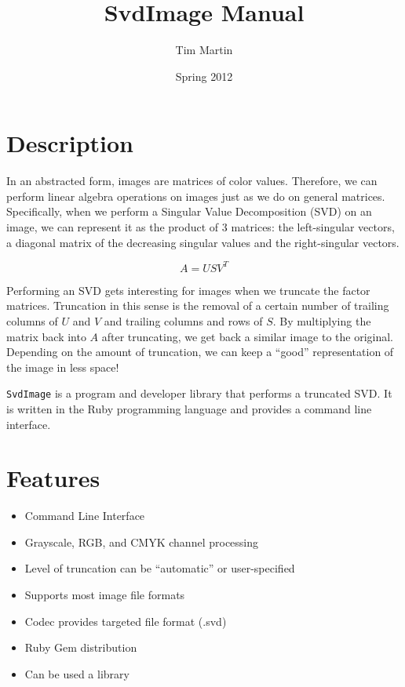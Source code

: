 \documentclass[12pt,letterpaper]{article}
\newcommand{\svdimage}{\texttt{SvdImage} }
\begin{document}
\title{SvdImage Manual}
\author{Tim Martin}
\date{Spring 2012}
\maketitle

\section{Description}
In an abstracted form, images are matrices of color values. Therefore, we can
perform linear algebra operations on images just as we do on general matrices.
Specifically, when we perform a Singular Value Decomposition (SVD) on an image,
we can represent it as the product of 3 matrices: the left-singular vectors,
a diagonal matrix of the decreasing singular values and the right-singular vectors.

\begin{equation}
A=USV^{T}
\end{equation}

Performing an SVD gets interesting for images when we truncate the factor
matrices. Truncation in this sense is the removal of a certain number of
trailing columns of $U$ and $V$ and trailing columns and rows of $S$. By
multiplying the matrix back into $A$ after truncating, we get back a similar
image to the original. Depending on the amount of truncation, we can keep a
``good'' representation of the image in less space! 

\svdimage is a program and developer library that performs a truncated SVD. It
is written in the Ruby programming language and provides a command line
interface.

\section{Features}
\begin{itemize}
\item Command Line Interface
\item Grayscale, RGB, and CMYK channel processing
\item Level of truncation can be ``automatic'' or user-specified
\item Supports most image file formats
\item Codec provides targeted file format (.svd)
\item Ruby Gem distribution
\item Can be used a library
\end{itemize}
\end{document}
